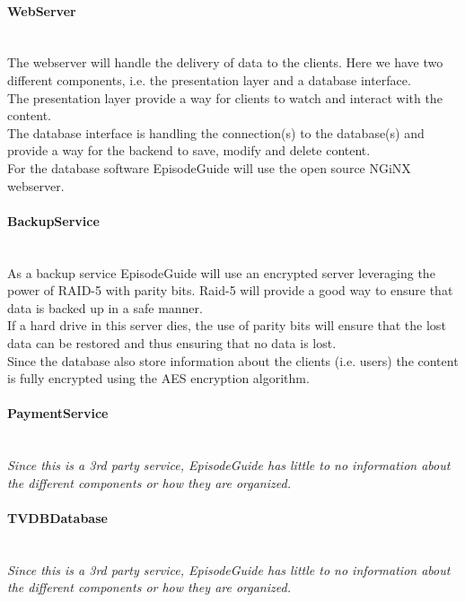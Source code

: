 \paragraph*{WebServer}~\\
The webserver will handle the delivery of data to the clients. Here we have two different components, i.e. the presentation layer and a database interface.\\
The presentation layer provide a way for clients to watch and interact with the content.\\
The database interface is handling the connection(s) to the database(s) and provide a way for the backend to save, modify and delete content.\\
For the database software EpisodeGuide will use the open source NGiNX webserver.

\paragraph*{BackupService}~\\
As a backup service EpisodeGuide will use an encrypted server leveraging the power of RAID-5 with parity bits. Raid-5 will provide a good way to ensure that data is backed up in a safe manner.\\
If a hard drive in this server dies, the use of parity bits will ensure that the lost data can be restored and thus ensuring that no data is lost.\\
Since the database also store information about the clients (i.e. users) the content is fully encrypted using the AES encryption algorithm.

\paragraph*{PaymentService}~\\
\textit{Since this is a 3rd party service, EpisodeGuide has little to no information about the different components or how they are organized.}

\paragraph*{TVDBDatabase}~\\
\textit{Since this is a 3rd party service, EpisodeGuide has little to no information about the different components or how they are organized.}

